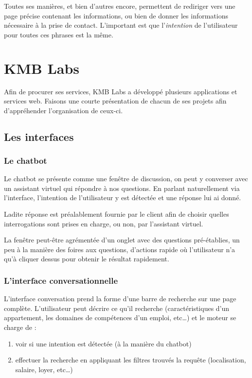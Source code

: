 \documentclass[12pt,a4paper,oneside]{scrreprt}
\begin{document}
Toutes ses manières, et bien d'autres encore, permettent de rediriger vers une page précise contenant les informations, ou bien de donner les informations nécessaire à la prise de contact. L'important est que l'\textit{intention} de l'utilisateur pour toutes ces phrases est la même.

\chapter{KMB Labs}
Afin de procurer ses services, KMB Labs a développé plusieurs applications et services web. Faisons une courte présentation de chacun de ses projets afin d'appréhender l'organisation de ceux-ci.

\section{Les interfaces}
\subsection{Le chatbot}

Le chatbot se présente comme une fenêtre de discussion, on peut y converser avec un assistant virtuel qui répondre à nos questions. En parlant naturellement via l'interface, l'intention de l'utilisateur y est détectée et une réponse lui ai donné.

Ladite réponse est préalablement fournie par le client afin de choisir quelles interrogations sont prises en charge, ou non, par l'assistant virtuel.

La fenêtre peut-être agrémentée d'un onglet avec des questions pré-établies, un peu à la manière des foires aux questions, d'actions rapide où l'utilisateur n'a qu'à cliquer dessus pour obtenir le résultat rapidement.

\subsection{L'interface conversationnelle}
L'interface conversation prend la forme d'une barre de recherche sur une page complète. L'utilisateur peut décrire ce qu'il recherche (caractéristiques d'un appartement, les domaines de compétences d'un emploi, etc\dots) et le moteur se charge de :
\begin{enumerate}
	\item voir si une intention est détectée (à la manière du chatbot)
	\item effectuer la recherche en appliquant les filtres trouvés la requête (localisation, salaire, loyer, etc\dots)
\end{enumerate}
\end{document}
